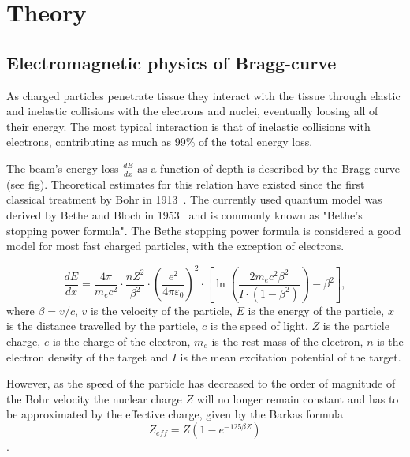 

\clearpage
\section{Theory}

\subsection{Electromagnetic physics of Bragg-curve}
As charged particles penetrate tissue they interact with the tissue through elastic and inelastic collisions with the electrons and nuclei, eventually loosing all of their energy. The most typical interaction is that of inelastic collisions with electrons, contributing as much as 99\% of the total energy loss.

The beam's energy loss $\frac{dE}{dx}$ as a function of depth is described by the Bragg curve (see fig). %
 Theoretical estimates for this relation have existed since the first classical treatment by Bohr in 1913~\cite{bohr13}. The currently used quantum model was derived by Bethe and Bloch in 1953~\cite{bethebloch53}  and is commonly known as "Bethe's stopping power formula". The Bethe stopping power formula is considered a good model for most fast charged particles, with the exception of electrons.

\begin{equation}
 \frac{dE}{dx} = \frac{4 \pi}{m_e c^2} \cdot \frac{nZ^2}{\beta^2} \cdot \left(\frac{e^2}{4\pi\varepsilon_0}\right)^2 \cdot \left[\ln \left(\frac{2m_e c^2 \beta^2}{I \cdot (1-\beta^2)}\right) - \beta^2\right],
\label{bethebloch}
\end{equation}
where $\beta = v/c $, 
$v$ is the velocity of the particle,
$E$ is the 
energy of the particle,
$x$ is the 
distance travelled by the particle,
$c$ is the 
speed of light,
$Z$ is the 
particle charge,
$e$ is the 
charge of the electron,
$m_e$ is the 
rest mass of the electron,
$n$ is the 
electron density of the target and 
$I$  is the 
mean excitation potential of the target.


However, as the speed of the particle has decreased to the order of magnitude of the Bohr velocity the nuclear charge $Z$ will no longer remain constant and has to be approximated by the effective charge, given by the Barkas formula $$Z_{eff} = Z(1-e^{-125 \beta Z})$$.

